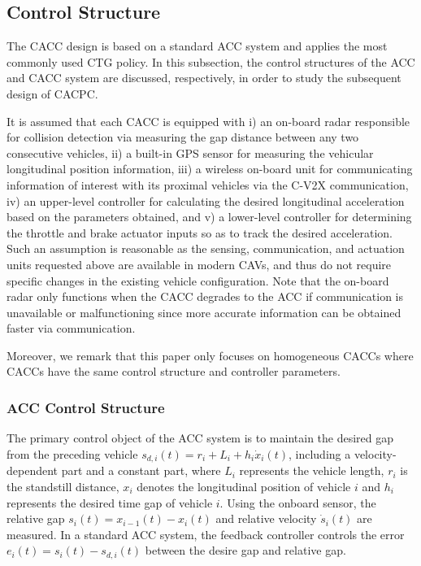 \documentclass[trsc,nonblindrev]{informs3} %
\begin{document}
\subsection{Control Structure}
\label{Section 2.3}
The CACC design is based on a standard ACC system and applies the most commonly used CTG policy. In this subsection, the control structures of the ACC and CACC system are discussed, respectively, in order to study the subsequent design of CACPC.

It is assumed that each CACC is equipped with i) an on-board radar responsible for collision detection via measuring the gap distance between any two consecutive vehicles, ii) a built-in GPS sensor for measuring the vehicular longitudinal position information, iii) a wireless on-board unit for communicating information of interest with its proximal vehicles via the C-V2X communication, iv) an upper-level controller for calculating the desired longitudinal acceleration based on the parameters obtained, and v) a lower-level controller for determining the throttle and brake actuator inputs so as to track the desired acceleration. Such an assumption is reasonable as the sensing, communication, and actuation units requested above are available in modern CAVs, and thus do not require specific changes in the existing vehicle configuration. Note that the on-board radar only functions when the CACC degrades to the ACC if communication is unavailable or malfunctioning since more accurate information can be obtained faster via communication.

Moreover, we remark that this paper only focuses on homogeneous CACCs where CACCs have the same control structure and controller parameters.


\subsubsection{ACC Control Structure}
\label{Section 2.3.1}
The primary control object of the ACC system is to maintain the desired gap from the preceding vehicle $s_{d, i}(t)=r_{i}+L_{i}+h_{i} \dot{x}_{i}(t)$, including a velocity-dependent part and a constant part, where $L_i$ represents the vehicle length, $r_i$ is the standstill distance, $x_i$ denotes the longitudinal position of vehicle $i$ and $h_i$ represents the desired time gap of vehicle $i$. Using the onboard sensor, the relative gap $s_{i}(t)=x_{i-1}(t)-x_{i}(t)$ and relative velocity $\dot{s}_{i} (t)$ are measured. In a standard ACC system, the feedback controller controls the error $e_{i}(t)=s_{i}(t)-s_{d, i}(t)$ between the desire gap and relative gap.
\end{document}
